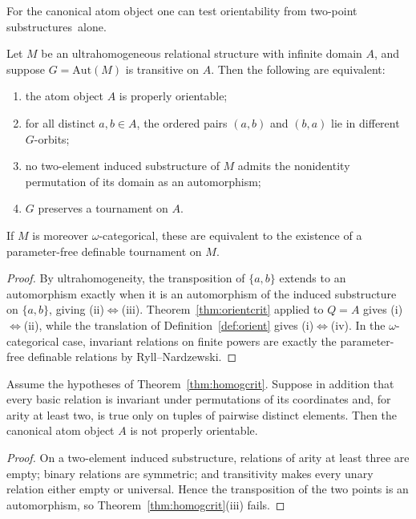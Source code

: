\documentclass{lmcs}
\newcommand{\Aut}{\mathrm{Aut}}
\begin{document}
\noindent
For the canonical atom object one can test orientability from two-point substructures~alone.

\begin{thm}\label{thm:homogcrit}
Let $M$ be an ultrahomogeneous relational structure with infinite domain
$A$, and suppose $G=\Aut(M)$ is transitive on $A$. Then the following are
equivalent:
\begin{enumerate}[label=\textup{(\roman*)}]
\item the atom object $A$ is properly orientable;
\item for all distinct $a,b\in A$, the ordered pairs $(a,b)$ and $(b,a)$
lie in different $G$-orbits;
\item no two-element induced substructure of $M$ admits the nonidentity
permutation of its domain as an automorphism;
\item $G$ preserves a tournament on $A$.
\end{enumerate}
If $M$ is moreover $\omega$-categorical, these are equivalent to the
existence of a parameter-free definable tournament on $M$.
\end{thm}
\begin{proof}
By ultrahomogeneity, the transposition of $\{a,b\}$ extends to an
automorphism exactly when it is an automorphism of the induced
substructure on $\{a,b\}$, giving (ii)$\Leftrightarrow$(iii).
Theorem~\ref{thm:orientcrit} applied to $Q=A$ gives
(i)$\Leftrightarrow$(ii), while the translation of
Definition~\ref{def:orient} gives (i)$\Leftrightarrow$(iv). In the
$\omega$-categorical case, invariant relations on finite powers are exactly
the parameter-free definable relations by Ryll--Nardzewski.
\end{proof}

\begin{cor}\label{cor:symmlang}
Assume the hypotheses of Theorem~\ref{thm:homogcrit}. Suppose in addition
that every basic relation is invariant under permutations of its
coordinates and, for arity at least two, is true only on tuples of pairwise
distinct elements. Then the canonical atom object $A$ is not properly
orientable.
\end{cor}
\begin{proof}
On a two-element induced substructure, relations of arity at least three
are empty; binary relations are symmetric; and transitivity makes every
unary relation either empty or universal. Hence the transposition of the
two points is an automorphism, so Theorem~\ref{thm:homogcrit}(iii) fails.
\end{proof}
\end{document}
